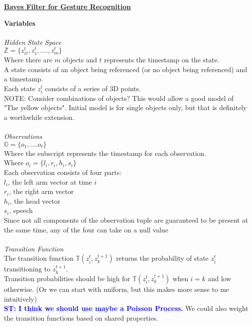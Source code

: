 \documentclass[12pt,letterpaper]{article}
\newcommand{\stnote}[1]{\textcolor{Blue}{\textbf{ST: #1}}}
\begin{document}
\begin{center}\textbf{\underline{Bayes Filter for Gesture Recognition}}\end{center}
\textbf{Variables}\\\\
\textit{Hidden State Space}\\
$\mathbb{Z} = \{z^t_\varnothing, z^t_1, ...., z^t_m\}$\\
Where there are $m$ objects and $t$ represents the timestamp on the state.\\
A state consists of an object being referenced (or no object being referenced) and a timestamp.\\
Each state $z^t_i$ consists of a series of 3D points.\\
NOTE: Consider combinations of objects? This would allow a good model of "The yellow objects". Initial model is for single objects only, but that is definitely a worthwhile extension.\\\\
\textit{Observations}\\
$\mathbb{O} = \{o_1, .... o_t\}$\\
Where the subscript represents the timestamp for each observation.\\
Where $o_i= \{l_i,r_i, h_i, s_i\}$\\
Each observation consists of four parts:\\
$l_i$, the left arm vector at time $i$\\
$r_i$, the right arm vector\\
$h_i$, the head vector\\
$s_i$, speech\\
Since not all components of the observation tuple are guaranteed to be present at the same time, any of the four can take on a null value\\\\
\textit{Transition Function}\\
The transition function $\mathbb{T}(z^t_i, z^{t+1}_k)$ returns the probability of state $z^t_i$ transitioning to $z^{t+1}_k$.\\
Transition probabilities should be high for $\mathbb{T}(z_i^t,z^{t+1}_k)$ when $i=k$ and low otherwise. (Or we can start with uniform, but this makes more sense to me intuitively)\\
\stnote{I think we should use maybe a Poisson Process. }
We could also weight the transition functions based on shared properties.\\\\
\end{document}
